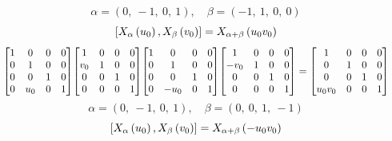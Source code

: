 \documentclass[11pt]{article}
\theoremstyle{definition}
\begin{document}
\[
\alpha = \left( 0, \  -1, \  0, \  1\right), \quad \beta = \left( -1, \  1, \  0, \  0\right)
\]
\[
\scaletoalign{\textwidth}{\left[ X_{\alpha}\left(u_{0}\right), X_{\beta}\left(v_{0}\right) \right] = X_{\alpha + \beta}\left(u_{0} v_{0}\right)}
\]
\[
\scaletoalign{\textwidth}{{\left[\begin{matrix}1 & 0 & 0 & 0\\0 & 1 & 0 & 0\\0 & 0 & 1 & 0\\0 & u_{0} & 0 & 1\end{matrix}\right]} {\left[\begin{matrix}1 & 0 & 0 & 0\\v_{0} & 1 & 0 & 0\\0 & 0 & 1 & 0\\0 & 0 & 0 & 1\end{matrix}\right]} {\left[\begin{matrix}1 & 0 & 0 & 0\\0 & 1 & 0 & 0\\0 & 0 & 1 & 0\\0 & - u_{0} & 0 & 1\end{matrix}\right]} {\left[\begin{matrix}1 & 0 & 0 & 0\\- v_{0} & 1 & 0 & 0\\0 & 0 & 1 & 0\\0 & 0 & 0 & 1\end{matrix}\right]} = {\left[\begin{matrix}1 & 0 & 0 & 0\\0 & 1 & 0 & 0\\0 & 0 & 1 & 0\\u_{0} v_{0} & 0 & 0 & 1\end{matrix}\right]}}
\]
\[
\alpha = \left( 0, \  -1, \  0, \  1\right), \quad \beta = \left( 0, \  0, \  1, \  -1\right)
\]
\[
\scaletoalign{\textwidth}{\left[ X_{\alpha}\left(u_{0}\right), X_{\beta}\left(v_{0}\right) \right] = X_{\alpha + \beta}\left(- u_{0} v_{0}\right)}
\]
\end{document}
